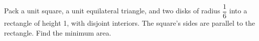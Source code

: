 Pack a unit square, a unit equilateral triangle, and two disks of radius $\dfrac{1}{6}$ into a rectangle of height 1, with disjoint interiors. The square's sides are parallel to the rectangle. Find the minimum area.
